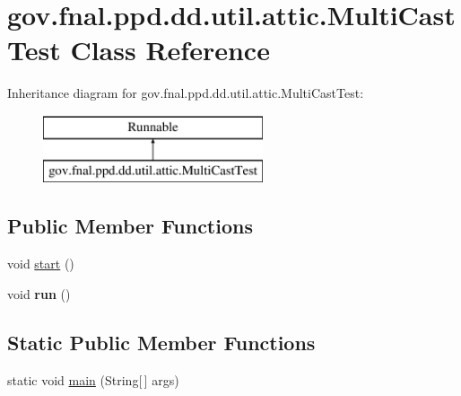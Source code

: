 \hypertarget{classgov_1_1fnal_1_1ppd_1_1dd_1_1util_1_1attic_1_1MultiCastTest}{\section{gov.\-fnal.\-ppd.\-dd.\-util.\-attic.\-Multi\-Cast\-Test Class Reference}
\label{classgov_1_1fnal_1_1ppd_1_1dd_1_1util_1_1attic_1_1MultiCastTest}
}
Inheritance diagram for gov.\-fnal.\-ppd.\-dd.\-util.\-attic.\-Multi\-Cast\-Test\-:\begin{figure}[H]
\begin{center}
\leavevmode
\includegraphics[height=2.000000cm]{classgov_1_1fnal_1_1ppd_1_1dd_1_1util_1_1attic_1_1MultiCastTest}
\end{center}
\end{figure}
\subsection*{Public Member Functions}
\begin{DoxyCompactItemize}
\item 
void \hyperlink{classgov_1_1fnal_1_1ppd_1_1dd_1_1util_1_1attic_1_1MultiCastTest_af48eb569b12f8df29915d98abaf537f7}{start} ()
\item 
\hypertarget{classgov_1_1fnal_1_1ppd_1_1dd_1_1util_1_1attic_1_1MultiCastTest_a20630e735bd7ce190af13ddd6eb9a68d}{void {\bfseries run} ()}\label{classgov_1_1fnal_1_1ppd_1_1dd_1_1util_1_1attic_1_1MultiCastTest_a20630e735bd7ce190af13ddd6eb9a68d}

\end{DoxyCompactItemize}
\subsection*{Static Public Member Functions}
\begin{DoxyCompactItemize}
\item 
static void \hyperlink{classgov_1_1fnal_1_1ppd_1_1dd_1_1util_1_1attic_1_1MultiCastTest_a35766761b1a1b1d67d0231b7ab48cf8f}{main} (String\mbox{[}$\,$\mbox{]} args)
\end{DoxyCompactItemize}


